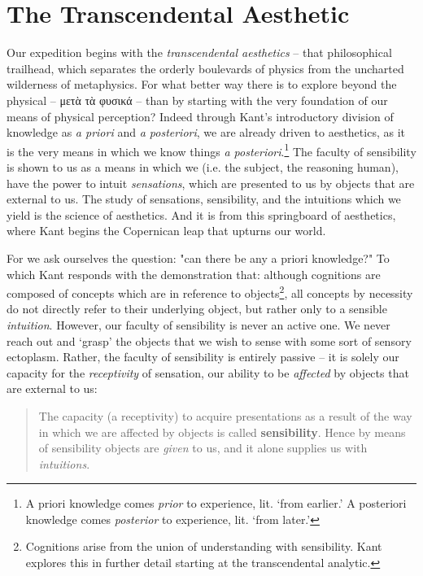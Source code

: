 \section*{The Transcendental Aesthetic}
Our expedition begins with the \emph{transcendental aesthetics} -- that philosophical trailhead, which separates the orderly boulevards of physics from the uncharted wilderness of metaphysics. For what better way there is to explore beyond the physical -- μετὰ τὰ φυσικά -- than by starting with the very foundation of our means of physical perception? Indeed through Kant's introductory division of knowledge as \emph{a priori} and \emph{a posteriori}, we are already driven to aesthetics, as it is the very means in which we know things \emph{a posteriori}.\footnote{A priori knowledge comes \emph{prior} to experience, lit. `from earlier.' A posteriori knowledge comes \emph{posterior} to experience, lit. `from later.'} The faculty of sensibility is shown to us as a means in which we (i.e. the subject, the reasoning human), have the power to intuit \emph{sensations}, which are presented to us by objects that are external to us. The study of sensations, sensibility, and the intuitions which we yield is the science of aesthetics. And it is from this springboard of aesthetics, where Kant begins the Copernican leap that upturns our world.

For we ask ourselves the question: "can there be any a priori knowledge?" To which Kant responds with the demonstration that: although cognitions are composed of concepts which are in reference to objects\footnote{Cognitions arise from the union of understanding with sensibility. Kant explores this in further detail starting at the transcendental analytic.}, all concepts by necessity do not directly refer to their underlying object, but rather only to a sensible \emph{intuition}. However, our faculty of sensibility is never an active one. We never reach out and `grasp' the objects that we wish to sense with some sort of sensory ectoplasm. Rather, the faculty of sensibility is entirely passive -- it is solely our capacity for the \emph{receptivity} of sensation, our ability to be \emph{affected} by objects that are external to us:

\begin{quote}
The capacity (a receptivity) to acquire presentations as a result of the way in which we are affected by objects is called \textbf{sensibility}. Hence by means of sensibility objects are \emph{given} to us, and it alone supplies us with \emph{intuitions}.

\autocite[B33]{hackett}
\end{quote}

